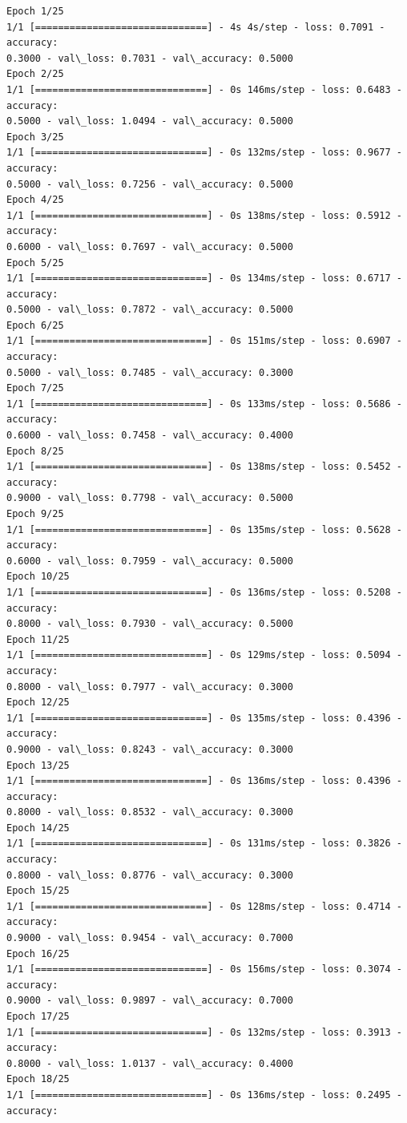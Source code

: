 \documentclass[11pt]{article}
\begin{document}
    \begin{Verbatim}[commandchars=\\\{\}]
Epoch 1/25
1/1 [==============================] - 4s 4s/step - loss: 0.7091 - accuracy:
0.3000 - val\_loss: 0.7031 - val\_accuracy: 0.5000
Epoch 2/25
1/1 [==============================] - 0s 146ms/step - loss: 0.6483 - accuracy:
0.5000 - val\_loss: 1.0494 - val\_accuracy: 0.5000
Epoch 3/25
1/1 [==============================] - 0s 132ms/step - loss: 0.9677 - accuracy:
0.5000 - val\_loss: 0.7256 - val\_accuracy: 0.5000
Epoch 4/25
1/1 [==============================] - 0s 138ms/step - loss: 0.5912 - accuracy:
0.6000 - val\_loss: 0.7697 - val\_accuracy: 0.5000
Epoch 5/25
1/1 [==============================] - 0s 134ms/step - loss: 0.6717 - accuracy:
0.5000 - val\_loss: 0.7872 - val\_accuracy: 0.5000
Epoch 6/25
1/1 [==============================] - 0s 151ms/step - loss: 0.6907 - accuracy:
0.5000 - val\_loss: 0.7485 - val\_accuracy: 0.3000
Epoch 7/25
1/1 [==============================] - 0s 133ms/step - loss: 0.5686 - accuracy:
0.6000 - val\_loss: 0.7458 - val\_accuracy: 0.4000
Epoch 8/25
1/1 [==============================] - 0s 138ms/step - loss: 0.5452 - accuracy:
0.9000 - val\_loss: 0.7798 - val\_accuracy: 0.5000
Epoch 9/25
1/1 [==============================] - 0s 135ms/step - loss: 0.5628 - accuracy:
0.6000 - val\_loss: 0.7959 - val\_accuracy: 0.5000
Epoch 10/25
1/1 [==============================] - 0s 136ms/step - loss: 0.5208 - accuracy:
0.8000 - val\_loss: 0.7930 - val\_accuracy: 0.5000
Epoch 11/25
1/1 [==============================] - 0s 129ms/step - loss: 0.5094 - accuracy:
0.8000 - val\_loss: 0.7977 - val\_accuracy: 0.3000
Epoch 12/25
1/1 [==============================] - 0s 135ms/step - loss: 0.4396 - accuracy:
0.9000 - val\_loss: 0.8243 - val\_accuracy: 0.3000
Epoch 13/25
1/1 [==============================] - 0s 136ms/step - loss: 0.4396 - accuracy:
0.8000 - val\_loss: 0.8532 - val\_accuracy: 0.3000
Epoch 14/25
1/1 [==============================] - 0s 131ms/step - loss: 0.3826 - accuracy:
0.8000 - val\_loss: 0.8776 - val\_accuracy: 0.3000
Epoch 15/25
1/1 [==============================] - 0s 128ms/step - loss: 0.4714 - accuracy:
0.9000 - val\_loss: 0.9454 - val\_accuracy: 0.7000
Epoch 16/25
1/1 [==============================] - 0s 156ms/step - loss: 0.3074 - accuracy:
0.9000 - val\_loss: 0.9897 - val\_accuracy: 0.7000
Epoch 17/25
1/1 [==============================] - 0s 132ms/step - loss: 0.3913 - accuracy:
0.8000 - val\_loss: 1.0137 - val\_accuracy: 0.4000
Epoch 18/25
1/1 [==============================] - 0s 136ms/step - loss: 0.2495 - accuracy:

\end{Verbatim}
\end{document}
